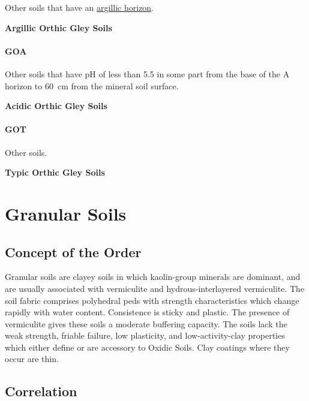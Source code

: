 \documentclass[
  letterpaper,
  DIV=11,
  numbers=noendperiod]{scrreprt}
\begin{document}
Other soils that have an \protect\hyperlink{sec-diag-argh}{argillic
horizon}.

\textbf{Argillic Orthic Gley Soils}

\hypertarget{sec-key-GOA}{%
\subsubsection{\texorpdfstring{\textbf{GOA}}{GOA}}\label{sec-key-GOA}}

Other soils that have pH of less than 5.5 in some part from the base of
the A horizon to 60~cm from the mineral soil surface.

\textbf{Acidic Orthic Gley Soils}

\hypertarget{sec-key-GOT}{%
\subsubsection{\texorpdfstring{\textbf{GOT}}{GOT}}\label{sec-key-GOT}}

Other soils.

\textbf{Typic Orthic Gley Soils}


\hypertarget{sec-ord-N}{%
\chapter{Granular Soils}\label{sec-ord-N}}

\hypertarget{sec-con-N}{%
\section{Concept of the Order}\label{sec-con-N}}

Granular soils are clayey soils in which kaolin-group minerals are
dominant, and are usually associated with vermiculite and
hydrous-interlayered vermiculite. The soil fabric comprises polyhedral
peds with strength characteristics which change rapidly with water
content. Consistence is sticky and plastic. The presence of vermiculite
gives these soils a moderate buffering capacity. The soils lack the weak
strength, friable failure, low plasticity, and low-activity-clay
properties which either define or are accessory to Oxidic Soils. Clay
coatings where they occur are thin.

\hypertarget{sec-cor-N}{%
\section{Correlation}\label{sec-cor-N}}
\end{document}
